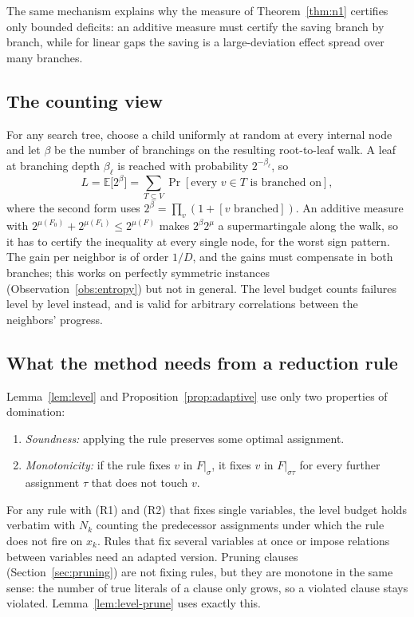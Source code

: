 \documentclass[11pt,a4paper]{article}
\theoremstyle{remark}
\newcommand{\E}{\mathbb{E}}
\begin{document}
The same mechanism explains why the measure of Theorem~\ref{thm:n1} certifies
only bounded deficits: an additive measure must certify the saving branch by
branch, while for linear gaps the saving is a large-deviation effect spread
over many branches.

\subsection{The counting view}

For any search tree, choose a child uniformly at random at every internal
node and let $\beta$ be the number of branchings on the resulting
root-to-leaf walk. A leaf at branching depth $\beta_\ell$ is reached with
probability $2^{-\beta_\ell}$, so
\[
 L=\E\bigl[2^{\beta}\bigr]=\sum_{T\subseteq V}\Pr[\text{every }v\in T\text{ is branched on}],
\]
where the second form uses $2^\beta=\prod_v(1+[v\text{ branched}])$. An
additive measure with $2^{\mu(F_0)}+2^{\mu(F_1)}\le2^{\mu(F)}$ makes
$2^\beta2^\mu$ a supermartingale along the walk, so it has to certify the
inequality at every single node, for the worst sign pattern. The gain per
neighbor is of order $1/D$, and the gains must compensate in both branches;
this works on perfectly symmetric instances (Observation~\ref{obs:entropy})
but not in general. The level budget counts failures level by level instead,
and is valid for arbitrary correlations between the neighbors' progress.

\subsection{What the method needs from a reduction rule}

Lemma~\ref{lem:level} and Proposition~\ref{prop:adaptive} use only two
properties of domination:
\begin{enumerate}
 \item[(R1)] \emph{Soundness:} applying the rule preserves some optimal
 assignment.
 \item[(R2)] \emph{Monotonicity:} if the rule fixes $v$ in $F|_\sigma$, it
 fixes $v$ in $F|_{\sigma\tau}$ for every further assignment $\tau$ that does
 not touch $v$.
\end{enumerate}
For any rule with (R1) and (R2) that fixes single variables, the level budget
holds verbatim with $N_k$ counting the predecessor assignments under which the
rule does not fire on $x_k$. Rules that fix several variables at once or
impose relations between variables need an adapted version. Pruning clauses
(Section~\ref{sec:pruning}) are not fixing rules, but they are monotone in the
same sense: the number of true literals of a clause only grows, so a violated
clause stays violated. Lemma~\ref{lem:level-prune} uses exactly this.
\end{document}
